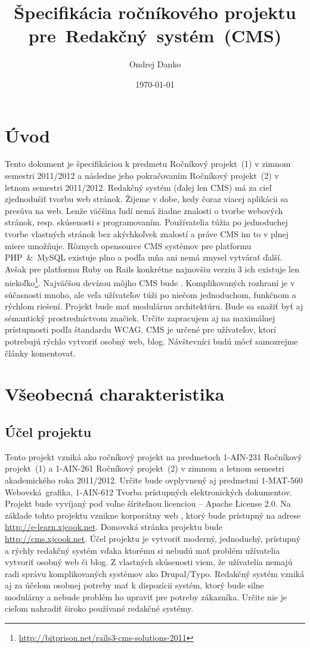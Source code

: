 \documentclass[a4paper,titlepage,11pt]{article}
\title{Špecifikácia ročníkového projektu \mbox{pre Redakčný systém (CMS)}}
\author{Ondrej Danko}
\date{\today}
\begin{document}
\maketitle

\tableofcontents
\thispagestyle{empty}

\newpage
\setcounter{page}{1}
\section{Úvod}
Tento dokument je špecifikáciou k predmetu Ročníkový projekt~(1) v zimnom semestri 2011/2012 a následne jeho pokračovaním Ročníkový projekt~(2) v letnom semestri 2011/2012. 
Redakčný systém (ďalej len CMS) má za cieľ zjednodušiť tvorbu web stránok. Žijeme v dobe, kedy čoraz viacej aplikácii sa presúva na web. 
Lenže väčšina ľudí nemá žiadne znalosti o tvorbe webových stránok, resp. skúsenosti s programovaním. 
Používatelia túžia po jednoduchej tvorbe vlastných stránok bez akýchkoľvek znalostí a práve CMS im to v plnej miere umožňuje. 
Rôznych opensource CMS systémov pre platformu \mbox{PHP \& MySQL} existuje plno a podľa mňa ani nemá zmysel vytvárať ďalší. 
Avšak pre platformu Ruby on Rails konkrétne najnovšiu verziu 3 ich existuje len niekoľko\footnote{\url{http://bitprison.net/rails3-cms-solutions-2011}}.
Najväčšou devízou môjho CMS bude . 
Komplikovaných rozhraní je v súčasnosti mnoho, ale veľa užívateľov túži po niečom jednoduchom, funkčnom a rýchlom riešení. 
Projekt bude mať modulárnu architektúru. Bude sa snažiť byť aj sémantický prostredníctvom značiek. 
Určite zapracujem aj na maximálnej prístupnosti podľa štandardu WCAG. CMS je určené pre užívateľov, ktorí potrebujú rýchlo vytvoriť osobný web, blog.
Návštevníci budú môcť samozrejme články komentovať.

\newpage
\section{Všeobecná charakteristika}
\subsection{Účel projektu}
Tento projekt vzniká ako ročníkový projekt na predmetoch 1-AIN-231 Ročníkový projekt~(1) a 1-AIN-261 Ročníkový projekt~(2) v zimnom a letnom semestri akademického roka 2011/2012. 
Určite bude ovplyvnený aj predmetmi 1-MAT-560 Webovská~grafika, 1-AIN-612 Tvorba prístupných elektronických dokumentov. 
Projekt bude vyvíjaný pod voľne šíriteľnou licenciou -- Apache License 2.0. 
Na základe tohto projektu vznikne korporátny web , ktorý bude prístupný na adrese \url{http://e-learn.xjcook.net}. 
Domovská stránka projektu bude \url{http://cms.xjcook.net}.
Účel projektu je vytvoriť moderný, jednoduchý, prístupný a rýchly redakčný systém vďaka ktorému si nebudú mať problém užívatelia vytvoriť osobný web či blog. 
Z vlastných skúsenosti viem, že užívatelia nemajú radi správu komplikovaných systémov ako \mbox{Drupal\slash Typo}. 
Redakčný systém vzniká aj za účelom osobnej potreby mať k dispozícii systém, ktorý bude silne modulárny a nebude problém ho upraviť pre potreby zákazníka. 
Určite nie je cieľom nahradiť široko používané redakčné systémy.
\end{document}
